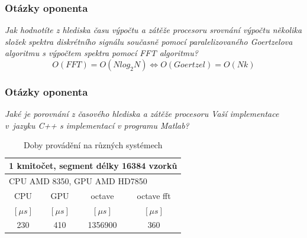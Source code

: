 \documentclass[%
  12pt,       				%
	t,                  %
	unicode,						%
czech ,             %
aspectratio=169
]{beamer}				    	%
\begin{document}
\begin{frame}
	\frametitle{Otázky oponenta}
	\emph{Jak hodnotíte z hlediska času výpočtu a zátěže procesoru srovnání výpočtu několika složek spektra diskrétního signálu současně pomocí paralelizovaného Goertzelova algoritmu s výpočtem spektra pomocí FFT algoritmu?}\\[2ex]
	\begin{equation}
\nonumber
O(FFT) = O(N log_2 N ) 	\Leftrightarrow O(Goertzel) = O(Nk)
\end{equation}	
\end{frame}


\begin{frame}
	\frametitle{Otázky oponenta}
	\emph{Jaké je porovnání z časového hlediska a zátěže procesoru Vaší implementace v~jazyku C++ s implementací v programu Matlab?}
	

	\begin{table}
	\centering	
	\begin{tabular}{|c|c|c|c|}
	\hline
	\multicolumn{4}{|l|}{1 kmitočet, segment délky 16384 vzorků}\\
	\hline
	\multicolumn{4}{|l|}{CPU AMD 8350, GPU AMD HD7850}\\
	\hline
	CPU & GPU & octave & octave fft \\
	$\left[ \mu s\right]$ & $\left[ \mu s\right]$ & $\left[ \mu s\right]$ & $\left[ \mu s\right]$\\
	\hline
	230 & 410 & 1356900 & 360\\	
	\hline
	\end{tabular}
	\caption{Doby provádění na různých systémech}
	\end{table}		
\end{frame}
\end{document}
